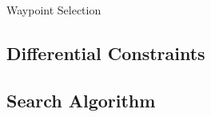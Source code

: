 \vspace{1cm}
\begin{algorithm}[H]
	\caption{Waypoint Selection}
	\label{alg:find_apexes}
	
	\SetAlgoLined
	\DontPrintSemicolon
	
	
\end{algorithm}
\vspace{1cm}



\subsection{Differential Constraints}
\label{sec:vehicle_model}

\subsection{Search Algorithm}